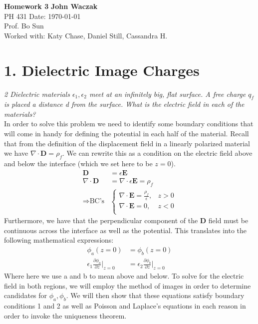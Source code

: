\documentclass[a4paper, 11pt]{article}
\begin{document}
\noindent
\large\textbf{Homework 3} \hfill \textbf{John Waczak} \\
\normalsize PH 431 \hfill  Date: \today \\
Prof. Bo Sun  \\
Worked with: Katy Chase, Daniel Still, Cassandra H. \\


\section*{1. Dielectric Image Charges}

\textit{2 Dielectric materials $\epsilon_1, \epsilon_2$ meet at an infinitely big, flat surface. A free charge $q_f$ is placed a distance d from the surface. What is the electric field in each of the materials?}\\ 

\noindent In order to solve this problem we need to identify some boundary conditions that will come in handy for defining the potential in each half of the material. Recall that from the definition of the displacement field in a linearly polarized material we have $\nabla \cdot \mathbf{D} = \rho_f$. We can rewrite this as a condition on the electric field above and below the interface (which we set here to be $z=0$). 
	\begin{align*}
		\mathbf{D} &= \epsilon \mathbf{E} \\
		\nabla \cdot \mathbf{D} &= \nabla \cdot \epsilon \mathbf{E} = \rho_f \\ 
		\Rightarrow \text{BC's} &
		\begin{cases}
			\nabla \cdot \mathbf{E} = \frac{\rho_f}{\epsilon}, & z > 0 \\ 
			\nabla \cdot \mathbf{E} = 0, & z < 0 \\
		\end{cases}
	\end{align*}
Furthermore, we have that the perpendicular component of the \textbf{D} field must be continuous across the interface as well as the potential. This translates into the following mathematical expressions: 
	\begin{align}
		\phi_{a}(z=0) &= \phi_{b}(z=0) \\ 
		\epsilon_1 \frac{\partial \phi_a}{\partial z} \Big|_{z=0} &= \epsilon_2 \frac{\partial \phi_b}{\partial z} \Big|_{z=0} 
	\end{align}
Where here we use a and b to mean above and below. To solve for the electric field in both regions, we will employ the method of images in order to determine candidates for $\phi_a, \phi_b$. We will then show that these equations satisfy boundary conditions 1 and 2 as well as Poisson and Laplace's equations in each reason in order to invoke the uniqueness theorem. \\ 
\end{document}
